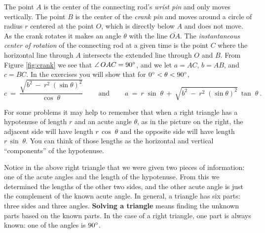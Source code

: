 \begin{exmp}
The point $A$ is the center of the connecting rod's \emph{wrist pin} and only moves vertically.
The point $B$ is the center of the \emph{crank pin} and moves around a circle of radius $r$ centered
at the point $O$, which is directly below $A$ and does not move. As the crank rotates it makes an
angle $\theta$ with the line $\overline{OA}$.
The \emph{instantaneous center of rotation} of the
connecting rod at a given time is the point $C$ where the horizontal line through $A$ intersects the
extended line through $O$ and $B$.
From Figure \ref{fig:crank} we see that $\angle\,OAC = 90^\circ$, and we let
$a = AC$, $b = AB$, and $c = BC$. In the exercises you will show that for
$0^\circ < \theta < 90^\circ$,
\begin{displaymath}
 c ~=~ \frac{\sqrt{b^2 ~-~ r^2 \;(\sin \theta)^2}}{\cos\;\theta} ~\qquad\text{and}\qquad~
 a ~=~ r\;\sin\;\theta ~+~ \sqrt{b^2 ~-~ r^2 \;(\sin \theta)^2}~\tan\;\theta ~.
\end{displaymath}
\end{exmp}
\divider
\newpage
{}
For some problems it may help to remember that when a right triangle has a hypotenuse of length $r$
and an acute angle $\theta$, as in the picture on the right, the adjacent side will have length
$r\,\cos\;\theta$ and the opposite side will have length $r\,\sin\;\theta$. You can think of those
lengths as the horizontal and vertical ``components'' of the hypotenuse.

Notice in the above right triangle that we were given two pieces of information: one of the acute
angles and the length of the hypotenuse. From this we determined the lengths of the other two
sides, and the other acute angle is just the complement of the known acute angle. In general, a
triangle has six parts: three sides and three angles. \textbf{Solving a triangle} means finding the unknown parts based on the known parts. In the case of a right triangle,
one part is always known: one of the angles is $90^\circ$.

